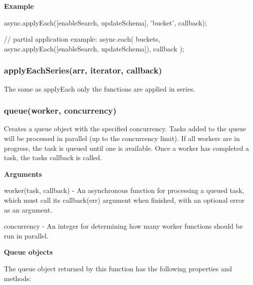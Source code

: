 {\bfseries Example}


\begin{DoxyCode}
async.applyEach([enableSearch, updateSchema], 'bucket', callback);

// partial application example:
async.each(
    buckets,
    async.applyEach([enableSearch, updateSchema]),
    callback
);
\end{DoxyCode}
 



\label{_applyEachSeries}%
 \subsubsection*{apply\+Each\+Series(arr, iterator, callback)}

The same as apply\+Each only the functions are applied in series. 



\label{_queue}%
 \subsubsection*{queue(worker, concurrency)}

Creates a queue object with the specified concurrency. Tasks added to the queue will be processed in parallel (up to the concurrency limit). If all workers are in progress, the task is queued until one is available. Once a worker has completed a task, the task\textquotesingle{}s callback is called.

{\bfseries Arguments}


\begin{DoxyItemize}
\item worker(task, callback) -\/ An asynchronous function for processing a queued task, which must call its callback(err) argument when finished, with an optional error as an argument.
\item concurrency -\/ An integer for determining how many worker functions should be run in parallel.
\end{DoxyItemize}

{\bfseries Queue objects}

The queue object returned by this function has the following properties and methods\+:


